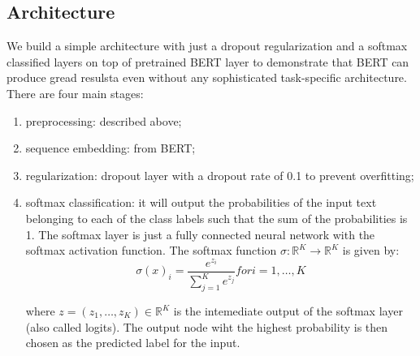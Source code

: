 \subsection{Architecture}

We build a simple architecture with just a dropout regularization and a softmax
classified layers on top of pretrained BERT layer to demonstrate that BERT can
produce gread resulsta even without any sophisticated task-specific
architecture. There are four main stages:

\begin{enumerate}
	\item preprocessing: described above;

	\item sequence embedding: from BERT;

	\item regularization: dropout layer with a dropout rate of 0.1 to prevent
	      overfitting;

	\item softmax classification: it will output the probabilities of the input
	      text belonging to each of the class labels such that the sum of the
	      probabilities is 1. The softmax layer is just a fully connected neural
	      network with the softmax activation function. The softmax function $\sigma:
		      \mathbb{R}^K \rightarrow \mathbb{R}^K$ is given by:
	      \begin{equation}
		      \sigma(x)_i = \frac{e^{z_i}}{\sum_{j=1}^K e^{z_j}} for i = 1, \ldots, K
	      \end{equation}

	      where $z = (z_1, \ldots, z_K) \in \mathbb{R}^K$ is the intemediate output of
	      the softmax layer (also called logits). The output node wiht the
	      highest probability is then chosen as the predicted label for the
	      input.
\end{enumerate}
